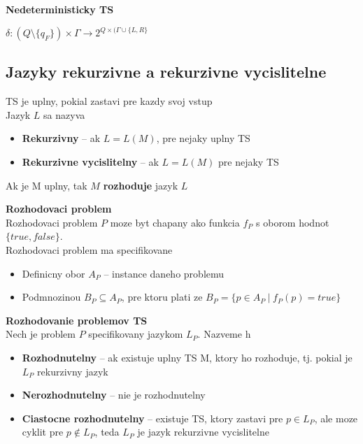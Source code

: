 \documentclass[12pt]{article}
\newcommand{\pipesep}{\hspace{3pt} \vert \hspace{3pt}}
\begin{document}
\textbf{Nedeterministicky TS}

$\delta: (Q \setminus \{q_{F}\}) \times \Gamma \to 2^{Q \times (\Gamma \cup \{L,R\}}$

\subsection*{Jazyky rekurzivne a rekurzivne vycislitelne}

TS je uplny, pokial zastavi pre kazdy svoj vstup \\
Jazyk $L$ sa nazyva
\begin{itemize}
	\item \textbf{Rekurzivny} -- ak $L = L(M)$, pre nejaky uplny TS
	\item \textbf{Rekurzivne vycislitelny} -- ak $L = L(M)$ pre nejaky TS
\end{itemize}
Ak je M uplny, tak $M$ \textbf{rozhoduje} jazyk $L$

\textbf{Rozhodovaci problem} \\
Rozhodovaci problem $P$ moze byt chapany ako funkcia $f_{P}$ s oborom hodnot $\{true, false\}$.\\
Rozhodovaci problem ma specifikovane\\
\begin{itemize}
	\item Definicny obor $A_{P}$ -- instance daneho problemu
	\item Podmnozinou $B_{P} \subseteq A_{P}$, pre ktoru plati ze $B_{P} = \{p \in A_{P} \pipesep f_{P}(p) = true\}$
\end{itemize}

\textbf{Rozhodovanie problemov TS}\\
Nech je problem $P$ specifikovany jazykom $L_{P}$. Nazveme h
\begin{itemize}
	\item \textbf{Rozhodnutelny} -- ak existuje uplny TS M, ktory ho rozhoduje, tj. pokial je $L_{P}$ rekurzivny jazyk
	\item \textbf{Nerozhodnutelny} -- nie je rozhodnutelny
	\item \textbf{Ciastocne rozhodnutelny} -- existuje TS, ktory zastavi pre $p \in L_{P}$, ale moze cyklit pre $p \not\in L_{P}$, teda $L_{P}$ je jazyk rekurzivne vycislitelne
\end{itemize}
\end{document}
